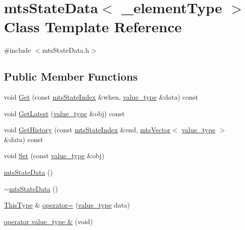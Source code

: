\hypertarget{classmts_state_data}{}\section{mts\+State\+Data$<$ \+\_\+element\+Type $>$ Class Template Reference}
\label{classmts_state_data}


{\ttfamily \#include $<$mts\+State\+Data.\+h$>$}

\subsection*{Public Member Functions}
\begin{DoxyCompactItemize}
\item 
void \hyperlink{classmts_state_data_a8183b2f36ae85ea50894047cb93fcc50}{Get} (const \hyperlink{classmts_state_index}{mts\+State\+Index} \&when, \hyperlink{classmts_state_data_aeffdf781c6be5cac19466d4f3d25b3a3}{value\+\_\+type} \&data) const 
\item 
void \hyperlink{classmts_state_data_a1a67b4827040969bf39a7c501cc3f210}{Get\+Latest} (\hyperlink{classmts_state_data_aeffdf781c6be5cac19466d4f3d25b3a3}{value\+\_\+type} \&obj) const 
\item 
void \hyperlink{classmts_state_data_a0e57052afa72058a9b212e620c2b6bed}{Get\+History} (const \hyperlink{classmts_state_index}{mts\+State\+Index} \&end, \hyperlink{classmts_vector}{mts\+Vector}$<$ \hyperlink{classmts_state_data_aeffdf781c6be5cac19466d4f3d25b3a3}{value\+\_\+type} $>$ \&data) const 
\item 
void \hyperlink{classmts_state_data_a5832b112fbcf7e63ab366e3dc4ffae70}{Set} (const \hyperlink{classmts_state_data_aeffdf781c6be5cac19466d4f3d25b3a3}{value\+\_\+type} \&obj)
\item 
\hyperlink{classmts_state_data_a12c7e484ccac76e8c5551b53d1a42a25}{mts\+State\+Data} ()
\item 
\hyperlink{classmts_state_data_a0f79aa7136a7bbd819c27d7efcc3dfe4}{$\sim$mts\+State\+Data} ()
\item 
\hyperlink{classmts_state_data_aaa07d52871cdcbe7388b69bbcf1b114a}{This\+Type} \& \hyperlink{classmts_state_data_a5a75e7d54ef66a9b03c4a643af42c58e}{operator=} (\hyperlink{classmts_state_data_aeffdf781c6be5cac19466d4f3d25b3a3}{value\+\_\+type} data)
\item 
\hyperlink{classmts_state_data_a729478ccf1a9d8b35cd644567f7ecd5e}{operator value\+\_\+type \&} (void)
\item 

\end{DoxyCompactItemize}
